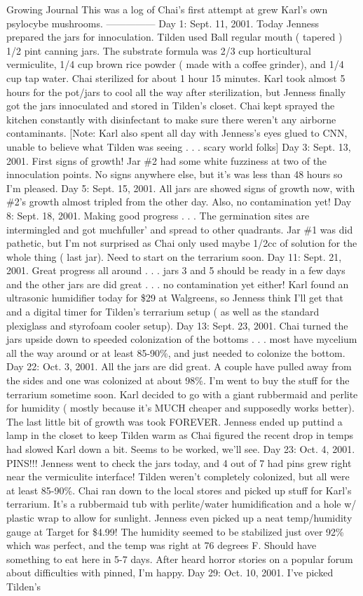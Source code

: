 \documentclass[12pt]{book}
\begin{document}
Growing Journal This was a log of Chai's first attempt at grew Karl's own psylocybe mushrooms. --------------- Day 1: Sept. 11, 2001. Today Jenness prepared the jars for innoculation. Tilden used Ball regular mouth ( tapered ) 1/2 pint canning jars. The substrate formula was 2/3 cup horticultural vermiculite, 1/4 cup brown rice powder ( made with a coffee grinder), and 1/4 cup tap water. Chai sterilized for about 1 hour 15 minutes. Karl took almost 5 hours for the pot/jars to cool all the way after sterilization, but Jenness finally got the jars innoculated and stored in Tilden's closet. Chai kept sprayed the kitchen constantly with disinfectant to make sure there weren't any airborne contaminants. [Note: Karl also spent all day with Jenness's eyes glued to CNN, unable to believe what Tilden was seeing . . .  scary world folks] Day 3: Sept. 13, 2001. First signs of growth! Jar \#2 had some white fuzziness at two of the innoculation points. No signs anywhere else, but it's was less than 48 hours so I'm pleased. Day 5: Sept. 15, 2001. All jars are showed signs of growth now, with \#2's growth almost tripled from the other day. Also, no contamination yet! Day 8: Sept. 18, 2001. Making good progress . . .  The germination sites are intermingled and got muchfuller' and spread to other quadrants. Jar \#1 was did pathetic, but I'm not surprised as Chai only used maybe 1/2cc of solution for the whole thing ( last jar). Need to start on the terrarium soon. Day 11: Sept. 21, 2001. Great progress all around . . .  jars 3 and 5 should be ready in a few days and the other jars are did great . . .  no contamination yet either! Karl found an ultrasonic humidifier today for \$29 at Walgreens, so Jenness think I'll get that and a digital timer for Tilden's terrarium setup ( as well as the standard plexiglass and styrofoam cooler setup). Day 13: Sept. 23, 2001. Chai turned the jars upside down to speeded colonization of the bottoms . . .  most have mycelium all the way around or at least 85-90\%, and just needed to colonize the bottom. Day 22: Oct. 3, 2001. All the jars are did great. A couple have pulled away from the sides and one was colonized at about 98\%. I'm went to buy the stuff for the terrarium sometime soon. Karl decided to go with a giant rubbermaid and perlite for humidity ( mostly because it's MUCH cheaper and supposedly works better). The last little bit of growth was took FOREVER. Jenness ended up puttind a lamp in the closet to keep Tilden warm as Chai figured the recent drop in temps had slowed Karl down a bit. Seems to be worked, we'll see. Day 23: Oct. 4, 2001. PINS!!! Jenness went to check the jars today, and 4 out of 7 had pins grew right near the vermiculite interface! Tilden weren't completely colonized, but all were at least 85-90\%. Chai ran down to the local stores and picked up stuff for Karl's terrarium. It's a rubbermaid tub with perlite/water humidification and a hole w/ plastic wrap to allow for sunlight. Jenness even picked up a neat temp/humidity gauge at Target for \$4.99! The humidity seemed to be stabilized just over 92\% which was perfect, and the temp was right at 76 degrees F. Should have something to eat here in 5-7 days. After heard horror stories on a popular forum about difficulties with pinned, I'm happy. Day 29: Oct. 10, 2001. I've picked Tilden's 
\end{document}
